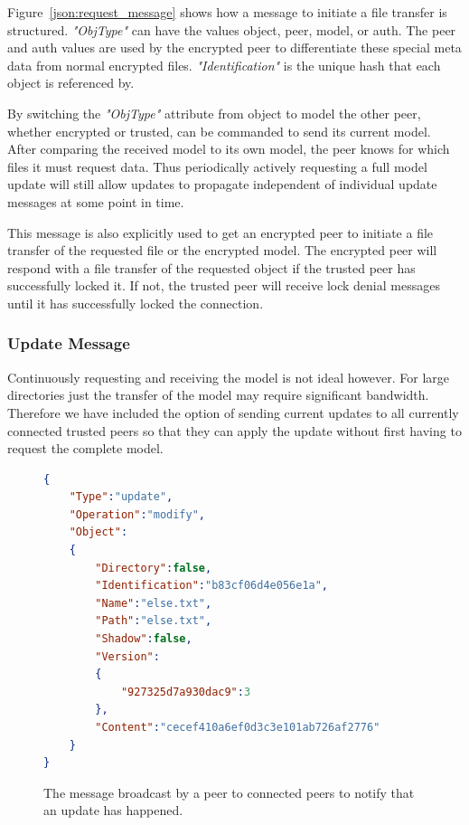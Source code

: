 Figure~\ref{json:request_message} shows how a message to initiate a file transfer is structured.
\textit{"ObjType"} can have the values object, peer, model, or auth.
The peer and auth values are used by the encrypted peer to differentiate these special meta data from normal encrypted files.
\textit{"Identification"} is the unique hash that each object is referenced by.

By switching the \textit{"ObjType"} attribute from object to model the other peer, whether encrypted or trusted, can be commanded to send its current model.
After comparing the received model to its own model, the peer knows for which files it must request data.
Thus periodically actively requesting a full model update will still allow updates to propagate independent of individual update messages at some point in time.

This message is also explicitly used to get an encrypted peer to initiate a file transfer of the requested file or the encrypted model.
The encrypted peer will respond with a file transfer of the requested object if the trusted peer has successfully locked it.
If not, the trusted peer will receive lock denial messages until it has successfully locked the connection.

\subsubsection{Update Message}
\label{subs:Update Message}

Continuously requesting and receiving the model is not ideal however.
For large directories just the transfer of the model may require significant bandwidth.
Therefore we have included the option of sending current updates to all currently connected trusted peers so that they can apply the update without first having to request the complete model.

\begin{figure}[htp]
    \begin{lstlisting}[language=json,firstnumber=0]
{
    "Type":"update",
    "Operation":"modify",
    "Object":
    {
        "Directory":false,
        "Identification":"b83cf06d4e056e1a",
        "Name":"else.txt",
        "Path":"else.txt",
        "Shadow":false,
        "Version":
        {
            "927325d7a930dac9":3
        },
        "Content":"cecef410a6ef0d3c3e101ab726af2776"
    }
}
    \end{lstlisting}
\caption[Update Object Message]{The message broadcast by a peer to connected peers to notify that an update has happened.}
\label{json:update_object}
\end{figure}

